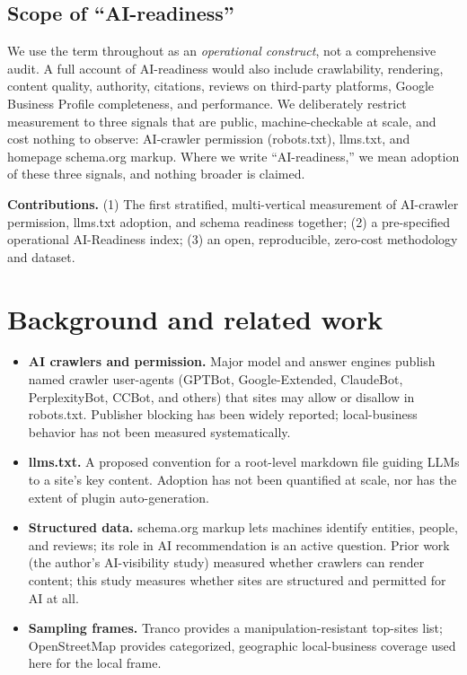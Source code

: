 \documentclass[11pt]{article}
\begin{document}
\subsection{Scope of ``AI-readiness''}

We use the term throughout as an \emph{operational construct}, not a comprehensive audit. A full
account of AI-readiness would also include crawlability, rendering, content quality, authority,
citations, reviews on third-party platforms, Google Business Profile completeness, and performance.
We deliberately restrict measurement to three signals that are public, machine-checkable at scale,
and cost nothing to observe: AI-crawler permission (robots.txt), llms.txt, and homepage schema.org
markup. Where we write ``AI-readiness,'' we mean adoption of these three signals, and nothing broader
is claimed.

\medskip
\noindent\textbf{Contributions.} (1) The first stratified, multi-vertical measurement of AI-crawler
permission, llms.txt adoption, and schema readiness together; (2) a pre-specified operational
AI-Readiness index; (3) an open, reproducible, zero-cost methodology and dataset.

\section{Background and related work}

\begin{itemize}
\item \textbf{AI crawlers and permission.} Major model and answer engines publish named crawler
user-agents (GPTBot, Google-Extended, ClaudeBot, PerplexityBot, CCBot, and others) that sites may
allow or disallow in robots.txt. Publisher blocking has been widely reported; local-business
behavior has not been measured systematically.
\item \textbf{llms.txt.} A proposed convention for a root-level markdown file guiding LLMs to a
site's key content. Adoption has not been quantified at scale, nor has the extent of plugin
auto-generation.
\item \textbf{Structured data.} schema.org markup lets machines identify entities, people, and
reviews; its role in AI recommendation is an active question. Prior work (the author's AI-visibility
study) measured whether crawlers can render content; this study measures whether sites are structured
and permitted for AI at all.
\item \textbf{Sampling frames.} Tranco provides a manipulation-resistant top-sites list;
OpenStreetMap provides categorized, geographic local-business coverage used here for the local frame.
\end{itemize}
\end{document}
